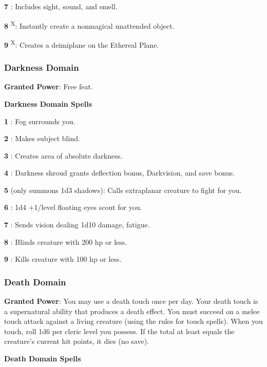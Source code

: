 \textbf{7} : Includes sight, sound, and smell.

\textbf{8} \textsuperscript{X}: Instantly create a nonmagical unattended object.

\textbf{9} \textsuperscript{X}: Creates a deimiplane on the Ethereal Plane.

\subsubsection{Darkness Domain}

\textbf{Granted Power}: Free  feat.

\textbf{Darkness Domain Spells}

\textbf{1} : Fog surrounds you.

\textbf{2} : Makes subject blind.

\textbf{3} : Creates area of absolute darkness.

\textbf{4} : Darkness shroud grants deflection bonus, Darkvision, and save bonus.

\textbf{5}  (only summons 1d3 shadows): Calls extraplanar creature to fight for you.

\textbf{6} : 1d4 +1/level floating eyes scout for you.

\textbf{7} : Sends vision dealing 1d10 damage, fatigue.

\textbf{8} : Blinds creature with 200 hp or less.

\textbf{9} : Kills creature with 100 hp or less.

\subsubsection{Death Domain}

\textbf{Granted Power}: You may use a death touch once per day. Your death touch is a supernatural ability that produces a death effect. You must succeed on a melee touch attack against a living creature (using the rules for touch spells). When you touch, roll 1d6 per cleric level you possess. If the total at least equals the creature's current hit points, it dies (no save).

\textbf{Death Domain Spells}

